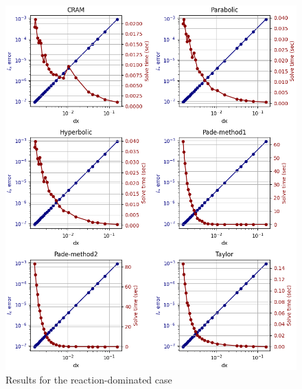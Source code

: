 \begin{figure}[p]
    \centering
    \includegraphics[width=5.0in]{images/chapter-5/reaction_dominated.png}
    \caption{Results for the reaction-dominated case}
    \label{fig:problem2_reaction_dom}
\end{figure}

\clearpage

